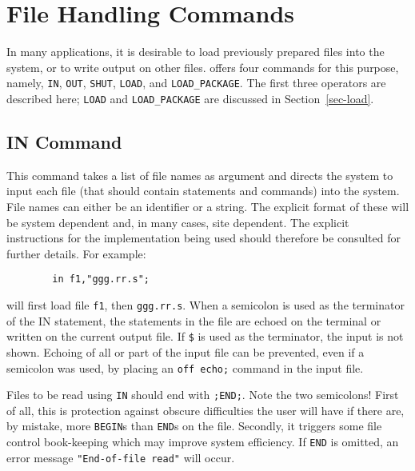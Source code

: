 \chapter{File Handling Commands}

In many applications, it is desirable to load previously prepared {\REDUCE}
files into the system, or to write output on other files. {\REDUCE} offers
four commands for this purpose, namely, \texttt{IN}, \texttt{OUT}, \texttt{SHUT},
\texttt{LOAD}, and \texttt{LOAD\_PACKAGE}.  
The first three operators are described here; \texttt{LOAD} and 
\texttt{LOAD\_PACKAGE} are discussed in Section~\ref{sec-load}.

\section{IN Command}
\hypertarget{command:IN}{}
\hypertarget{switch:ECHO}{}
\hypertarget{reserved:__FILE__}{}
\hypertarget{reserved:__LINE__}{}
This command takes a list of file names as argument and directs the system
to input each file (that should contain {\REDUCE} statements
and commands) into the system.  File names can either be an identifier or
a string.  The explicit format of these will be system dependent and, in
many cases, site dependent.  The explicit instructions for the
implementation being used should therefore be consulted for further
details. For example:
\begin{verbatim}
        in f1,"ggg.rr.s";
\end{verbatim}
will first load file \texttt{f1}, then \texttt{ggg.rr.s}.  When a semicolon is
used as the terminator of the IN statement, the statements in the file are
echoed on the terminal or written on the current output file.  If \texttt{\$}
 is used as the terminator, the input is not
shown.  Echoing of all or part of the input file can be prevented, even if
a semicolon was used, by placing an \texttt{off echo;} command
in the input file.

Files to be read using \texttt{IN} should end with \texttt{;END;}.  Note the two
semicolons!  First of all, this is protection against obscure difficulties
the user will have if there are, by mistake, more \texttt{BEGIN}s than
\texttt{END}s on the file.  Secondly, it triggers some file control book-keeping
which may improve system efficiency.  If \texttt{END} is omitted, an error
message \texttt{"End-of-file read"} will occur.

